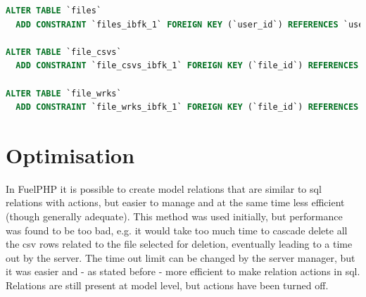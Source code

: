 \begin{lstlisting}[language=sql]
ALTER TABLE `files`
  ADD CONSTRAINT `files_ibfk_1` FOREIGN KEY (`user_id`) REFERENCES `users` (`id`) ON DELETE NO ACTION ON UPDATE NO ACTION;

ALTER TABLE `file_csvs`
  ADD CONSTRAINT `file_csvs_ibfk_1` FOREIGN KEY (`file_id`) REFERENCES `files` (`id`) ON DELETE CASCADE ON UPDATE NO ACTION;

ALTER TABLE `file_wrks`
  ADD CONSTRAINT `file_wrks_ibfk_1` FOREIGN KEY (`file_id`) REFERENCES `files` (`id`) ON DELETE CASCADE ON UPDATE NO ACTION;
\end{lstlisting}

\section{Optimisation}

In FuelPHP it is possible to create model relations that are similar to sql relations with actions, but easier to manage and at the same time less efficient (though generally adequate). This method was used initially, but performance was found to be too bad, e.g. it would take too much time to cascade delete all the csv rows related to the file selected for deletion, eventually leading to a time out by the server. The time out limit can be changed by the server manager, but it was easier and - as stated before - more efficient to make relation actions in sql. Relations are still present at model level, but actions have been turned off.
